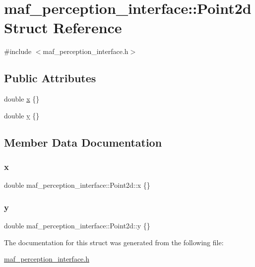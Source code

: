 \hypertarget{structmaf__perception__interface_1_1Point2d}{}\section{maf\+\_\+perception\+\_\+interface\+:\+:Point2d Struct Reference}
\label{structmaf__perception__interface_1_1Point2d}


{\ttfamily \#include $<$maf\+\_\+perception\+\_\+interface.\+h$>$}

\subsection*{Public Attributes}
\begin{DoxyCompactItemize}
\item 
double \hyperlink{structmaf__perception__interface_1_1Point2d_a1cbf2477750d9c160a3b2f1780faa752}{x} \{\}
\item 
double \hyperlink{structmaf__perception__interface_1_1Point2d_a83f7349b64cd202e4dfd35ee2ff7f95e}{y} \{\}
\end{DoxyCompactItemize}


\subsection{Member Data Documentation}
\mbox{\label{structmaf__perception__interface_1_1Point2d_a1cbf2477750d9c160a3b2f1780faa752}} 
\subsubsection{\texorpdfstring{x}{x}}
{\footnotesize\ttfamily double maf\+\_\+perception\+\_\+interface\+::\+Point2d\+::x \{\}}

\mbox{\label{structmaf__perception__interface_1_1Point2d_a83f7349b64cd202e4dfd35ee2ff7f95e}} 
\subsubsection{\texorpdfstring{y}{y}}
{\footnotesize\ttfamily double maf\+\_\+perception\+\_\+interface\+::\+Point2d\+::y \{\}}



The documentation for this struct was generated from the following file\+:\begin{DoxyCompactItemize}
\item 
\hyperlink{maf__perception__interface_8h}{maf\+\_\+perception\+\_\+interface.\+h}\end{DoxyCompactItemize}
